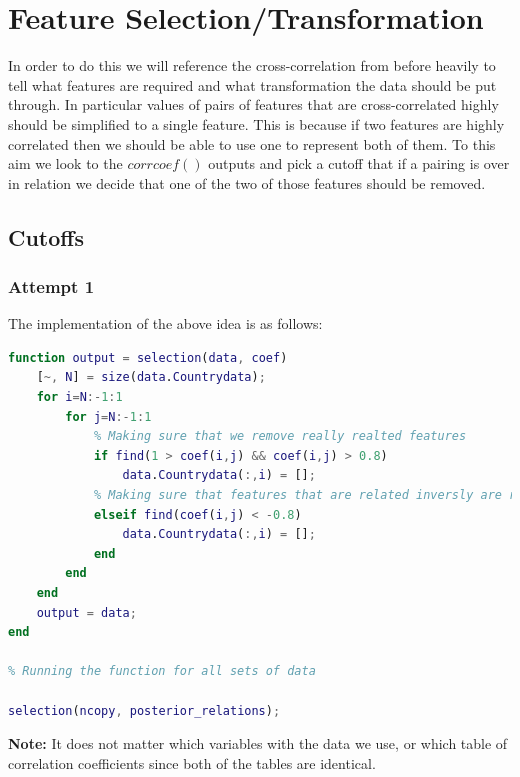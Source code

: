 \documentclass[12pt, a4paper]{article}
\begin{document}
\section{Feature Selection/Transformation}

In order to do this we will reference the cross-correlation from before heavily to tell what features are required and what transformation the data should be put through. In particular values of pairs of features that are cross-correlated highly should be simplified to a single feature. This is because if two features are highly correlated then we should be able to use one to represent both of them. To this aim we look to the $corrcoef()$ outputs and pick a cutoff that if a pairing is over in relation we decide that one of the two of those features should be removed.

\subsection{Cutoffs}

\subsubsection{Attempt 1}

The implementation of the above idea is as follows:

\begin{lstlisting}[language=Matlab, label=lst:feat, caption=The code that selects features to keep.]
% Deciding what features to use since some of them are evidently related very much
function output = selection(data, coef)
    [~, N] = size(data.Countrydata);
    for i=N:-1:1
        for j=N:-1:1
            % Making sure that we remove really realted features
            if find(1 > coef(i,j) && coef(i,j) > 0.8)
                data.Countrydata(:,i) = [];
            % Making sure that features that are related inversly are removed
            elseif find(coef(i,j) < -0.8)
                data.Countrydata(:,i) = [];
            end
        end
    end
    output = data;
end

% Running the function for all sets of data

selection(ncopy, posterior_relations);
\end{lstlisting}

\textbf{Note: }It does not matter which variables with the data we use, or which table of correlation coefficients since both of the tables are identical.
\newline
\end{document}
